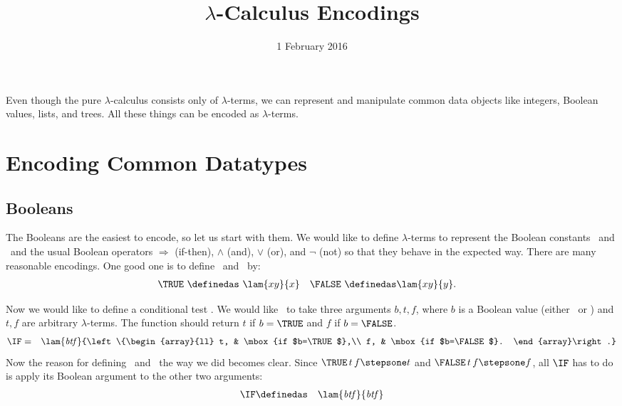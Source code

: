 \title{$\lambda$-Calculus Encodings}
\date{1 February 2016}
\maketitle

Even though the pure $\lambda$-calculus consists only of $\lambda$-terms, we can represent and manipulate common data objects like integers, Boolean values, lists, and trees.  All these things can be encoded as $\lambda$-terms.

\section{Encoding Common Datatypes}

\subsection{Booleans}

The Booleans are the easiest to encode, so let us start with them.  We would like to define $\lambda$-terms to represent the Boolean constants \TRUE\ and \FALSE\ and the usual Boolean operators $\Rightarrow$ (if-then), $\wedge$ (and), $\vee$ (or), and $\neg$ (not) so that they behave in the expected way.  There are many reasonable encodings.  One good one is to define \TRUE\ and \FALSE\ by:
\begin{align*}
\TRUE\ &\definedas\ \lam{xy}{x} &
\FALSE\ &\definedas \lam{xy}{y}.
\end{align*}

Now we would like to define a conditional test \IF.  We would like \IF\ to take three arguments $b,t,f$, where $b$ is a Boolean value (either \TRUE\ or \FALSE) and $t,f$ are arbitrary $\lambda$-terms.  The function should return $t$ if $b=\TRUE$ and $f$ if $b=\FALSE$.
\begin{eqnarray*}
\IF &=& \lam{\mathit{btf}}{\left\{\begin{array}{ll}
t, & \mbox{if $b=\TRUE$},\\
f, & \mbox{if $b=\FALSE$}.
\end{array}\right.}
\end{eqnarray*}
Now the reason for defining \TRUE\ and \FALSE\ the way we did becomes clear.  Since $\TRUE\,t\,f\stepsone t$ and $\FALSE\,t\,f\stepsone f$, all $\IF$ has to do is apply its Boolean argument to the other two arguments:
\begin{eqnarray*}
\IF &\definedas& \lam{\mathit{btf}}{\mathit{btf}}
\end{eqnarray*}

